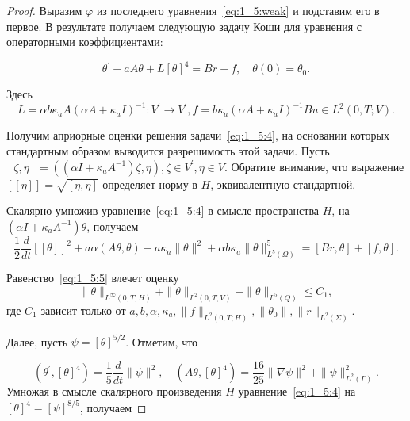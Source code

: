 \begin{proof}

    Выразим $\varphi$ из последнего уравнения~\eqref{eq:1_5:weak} и подставим его в первое.
    В результате получаем следующую задачу Коши для уравнения с операторными коэффициентами:

    \begin{equation}
        \label{eq:1_5:4}
        \theta^{\prime}+a A \theta+L[\theta]^{4}=B r+f, \quad \theta(0)=\theta_{0}.
    \end{equation}

    Здесь
    \[
        L=\alpha b \kappa_{a} A\left(\alpha A+\kappa_{a} I\right)^{-1}:
        V^{\prime} \rightarrow V^{\prime},
        f=b \kappa_{a}\left(\alpha A+\kappa_{a} I\right)^{-1} B u \in L^{2}(0, T ; V).
    \]

    Получим априорные оценки решения задачи~\eqref{eq:1_5:4},
    на основании которых стандартным образом выводится разрешимость этой задачи.
    Пусть $[\zeta, \eta]=\left(\left(\alpha I+\kappa_{a} A^{-1}\right) \zeta,
    \eta\right), \zeta \in V^{\prime}, \eta \in V$.
    Обратите внимание, что выражение $[[\eta]]=\sqrt{[\eta, \eta]}$
    определяет норму в $H$, эквивалентную стандартной.

    Скалярно умножив уравнение~\eqref{eq:1_5:4} в смысле пространства $H$,
    на $\left(\alpha I+\kappa_{a} A^{-1}\right) \theta$, получаем
    \begin{equation}
        \label{eq:1_5:5}
        \frac{1}{2} \frac{d}{d t}[[\theta]]^{2}+a \alpha(A \theta, \theta)
        +a \kappa_{a}\|\theta\|^{2}
        +\alpha b \kappa_{a}\|\theta\|_{L^{5}(\Omega)}^{5}=[B r, \theta]+[f, \theta].
    \end{equation}

    Равенство~\eqref{eq:1_5:5} влечет оценку
    \[
        \|\theta\|_{L^{\infty}(0, T ; H)}+\|\theta\|_{L^{2}(0, T ; V)}+\|\theta\|_{L^{5}(Q)} \leq C_{1},
    \]
    где $C_{1}$ зависит только от
    $a, b, \alpha, \kappa_{a},\|f\|_{L^{2}(0, T ; H)},\left\|\theta_{0}\right\|,\|r\|_{L^{2}(\Sigma)}$.

    Далее, пусть $\psi=[\theta]^{5 / 2}$.
    Отметим, что

    \[
        \left(\theta^{\prime},[\theta]^{4}\right)
        =\frac{1}{5} \frac{d}{d t}\|\psi\|^{2}, \quad\left(A \theta,[\theta]^{4}\right)
        =\frac{16}{25}\|\nabla \psi\|^{2}+\|\psi\|_{L^{2}(\Gamma)}^{2}.
    \]
    Умножая в смысле скалярного произведения $H$ уравнение~\eqref{eq:1_5:4}
    на $[\theta]^{4}=[\psi]^{8 / 5}$, получаем


\end{proof}
